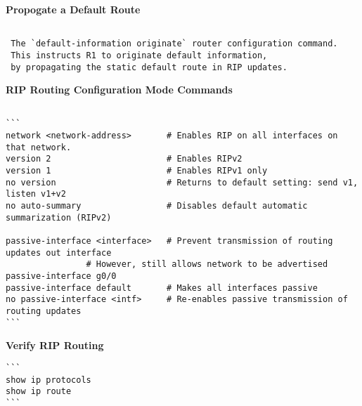 \documentclass[../EngineeringJournal_CDavis.tex]{subfiles}
\begin{document}

\hspace{0.2cm}
\begin{tcolorbox}[width=6.3in]
  {\bf{Propogate a Default Route}}
\scriptsize
\begin{verbatim}

 The `default-information originate` router configuration command. 
 This instructs R1 to originate default information, 
 by propagating the static default route in RIP updates.

 \end{verbatim}
\end{tcolorbox}
\hspace{0.2cm}
\normalsize  


\hspace{0.2cm}
\begin{tcolorbox}[width=6.3in]
  {\bf{RIP Routing Configuration Mode Commands}}
\scriptsize
\begin{verbatim}

```
network <network-address>       # Enables RIP on all interfaces on that network.
version 2                       # Enables RIPv2
version 1                       # Enables RIPv1 only
no version                      # Returns to default setting: send v1, listen v1+v2
no auto-summary                 # Disables default automatic summarization (RIPv2)

passive-interface <interface>   # Prevent transmission of routing updates out interface
				# However, still allows network to be advertised
passive-interface g0/0
passive-interface default       # Makes all interfaces passive
no passive-interface <intf>     # Re-enables passive transmission of routing updates
```
\end{verbatim}
\end{tcolorbox}
\hspace{0.2cm}
\normalsize  


\hspace{0.2cm}
\begin{tcolorbox}[width=6.3in]
{\bf{Verify RIP Routing}}
\scriptsize
\begin{verbatim}
```
show ip protocols
show ip route
```
\end{verbatim}
\end{tcolorbox}
\hspace{0.2cm}
\normalsize  
\end{document}
